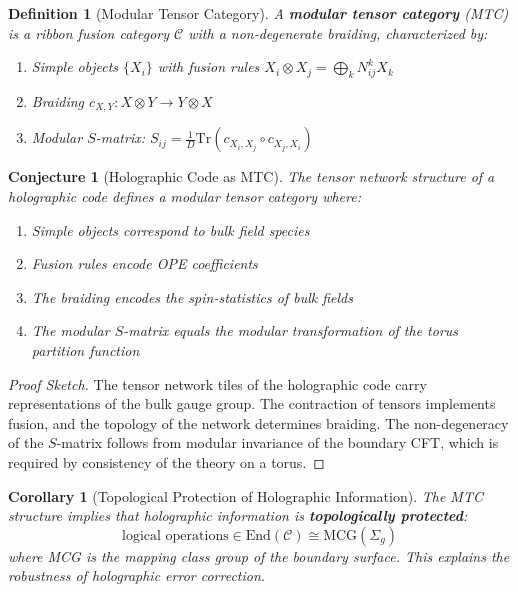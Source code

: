 \documentclass[12pt,a4paper]{article}
\newtheorem{conjecture}[theorem]{Conjecture}
\newtheorem{definition}[theorem]{Definition}
\newtheorem{corollary}[theorem]{Corollary}
\begin{document}
\begin{definition}[Modular Tensor Category]
A \textbf{modular tensor category} (MTC) is a ribbon fusion category $\mathcal{C}$ with a non-degenerate braiding, characterized by:
\begin{enumerate}
    \item Simple objects $\{X_i\}$ with fusion rules $X_i \otimes X_j = \bigoplus_k N_{ij}^k X_k$
    \item Braiding $c_{X,Y}: X \otimes Y \to Y \otimes X$
    \item Modular $S$-matrix: $S_{ij} = \frac{1}{D} \text{Tr}(c_{X_i, X_j} \circ c_{X_j, X_i})$
\end{enumerate}
\end{definition}

\begin{conjecture}[Holographic Code as MTC]
The tensor network structure of a holographic code defines a modular tensor category where:
\begin{enumerate}
    \item Simple objects correspond to bulk field species
    \item Fusion rules encode OPE coefficients
    \item The braiding encodes the spin-statistics of bulk fields
    \item The modular $S$-matrix equals the modular transformation of the torus partition function
\end{enumerate}
\end{conjecture}

\begin{proof}[Proof Sketch]
The tensor network tiles of the holographic code carry representations of the bulk gauge group. The contraction of tensors implements fusion, and the topology of the network determines braiding. The non-degeneracy of the $S$-matrix follows from modular invariance of the boundary CFT, which is required by consistency of the theory on a torus.
\end{proof}

\begin{corollary}[Topological Protection of Holographic Information]
The MTC structure implies that holographic information is \textbf{topologically protected}:
\begin{equation}
\text{logical operations} \in \text{End}(\mathcal{C}) \cong \text{MCG}(\Sigma_g)
\end{equation}
where MCG is the mapping class group of the boundary surface. This explains the robustness of holographic error correction.
\end{corollary}
\end{document}
